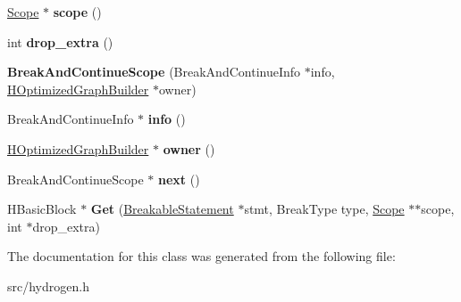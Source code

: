 \begin{DoxyCompactItemize}
\item 
\hypertarget{classv8_1_1internal_1_1_h_optimized_graph_builder_1_1_b_a_s_e___e_m_b_e_d_d_e_d_ae61a48f47986f29910992c8ccb191250}{}\hyperlink{classv8_1_1internal_1_1_scope}{Scope} $\ast$ {\bfseries scope} ()\label{classv8_1_1internal_1_1_h_optimized_graph_builder_1_1_b_a_s_e___e_m_b_e_d_d_e_d_ae61a48f47986f29910992c8ccb191250}

\item 
\hypertarget{classv8_1_1internal_1_1_h_optimized_graph_builder_1_1_b_a_s_e___e_m_b_e_d_d_e_d_a6dcb12d018ae5be197875449d5ee311a}{}int {\bfseries drop\+\_\+extra} ()\label{classv8_1_1internal_1_1_h_optimized_graph_builder_1_1_b_a_s_e___e_m_b_e_d_d_e_d_a6dcb12d018ae5be197875449d5ee311a}

\item 
\hypertarget{classv8_1_1internal_1_1_h_optimized_graph_builder_1_1_b_a_s_e___e_m_b_e_d_d_e_d_a4753dea76d64594c6f57f22257a7dffe}{}{\bfseries Break\+And\+Continue\+Scope} (Break\+And\+Continue\+Info $\ast$info, \hyperlink{classv8_1_1internal_1_1_h_optimized_graph_builder}{H\+Optimized\+Graph\+Builder} $\ast$owner)\label{classv8_1_1internal_1_1_h_optimized_graph_builder_1_1_b_a_s_e___e_m_b_e_d_d_e_d_a4753dea76d64594c6f57f22257a7dffe}

\item 
\hypertarget{classv8_1_1internal_1_1_h_optimized_graph_builder_1_1_b_a_s_e___e_m_b_e_d_d_e_d_a57a5151cca7d09d120ef027093b2c5bf}{}Break\+And\+Continue\+Info $\ast$ {\bfseries info} ()\label{classv8_1_1internal_1_1_h_optimized_graph_builder_1_1_b_a_s_e___e_m_b_e_d_d_e_d_a57a5151cca7d09d120ef027093b2c5bf}

\item 
\hypertarget{classv8_1_1internal_1_1_h_optimized_graph_builder_1_1_b_a_s_e___e_m_b_e_d_d_e_d_ae6fb8f247b099fa6d32fc4aee1d22b80}{}\hyperlink{classv8_1_1internal_1_1_h_optimized_graph_builder}{H\+Optimized\+Graph\+Builder} $\ast$ {\bfseries owner} ()\label{classv8_1_1internal_1_1_h_optimized_graph_builder_1_1_b_a_s_e___e_m_b_e_d_d_e_d_ae6fb8f247b099fa6d32fc4aee1d22b80}

\item 
\hypertarget{classv8_1_1internal_1_1_h_optimized_graph_builder_1_1_b_a_s_e___e_m_b_e_d_d_e_d_a8df3ee059b066aa9ced62ce7a863dba5}{}Break\+And\+Continue\+Scope $\ast$ {\bfseries next} ()\label{classv8_1_1internal_1_1_h_optimized_graph_builder_1_1_b_a_s_e___e_m_b_e_d_d_e_d_a8df3ee059b066aa9ced62ce7a863dba5}

\item 
\hypertarget{classv8_1_1internal_1_1_h_optimized_graph_builder_1_1_b_a_s_e___e_m_b_e_d_d_e_d_a45d989f82f1d8f1f7de8731914d79c5c}{}H\+Basic\+Block $\ast$ {\bfseries Get} (\hyperlink{classv8_1_1internal_1_1_breakable_statement}{Breakable\+Statement} $\ast$stmt, Break\+Type type, \hyperlink{classv8_1_1internal_1_1_scope}{Scope} $\ast$$\ast$scope, int $\ast$drop\+\_\+extra)\label{classv8_1_1internal_1_1_h_optimized_graph_builder_1_1_b_a_s_e___e_m_b_e_d_d_e_d_a45d989f82f1d8f1f7de8731914d79c5c}

\end{DoxyCompactItemize}


The documentation for this class was generated from the following file\+:\begin{DoxyCompactItemize}
\item 
src/hydrogen.\+h\end{DoxyCompactItemize}
